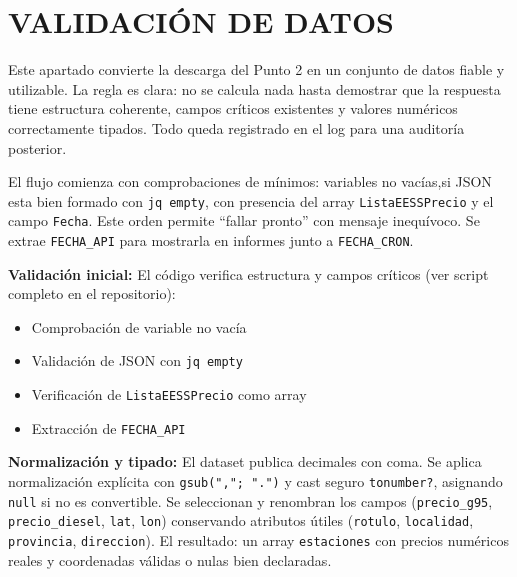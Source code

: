 \chapter{VALIDACIÓN DE DATOS}

Este apartado convierte la descarga del Punto 2 en un conjunto de datos fiable y utilizable. La regla es clara: no se calcula nada hasta demostrar que la respuesta tiene estructura coherente, campos críticos existentes y valores numéricos correctamente tipados. Todo queda registrado en el log para una auditoría posterior.

El flujo comienza con comprobaciones de mínimos: variables no vacías,si JSON esta bien formado con \texttt{jq empty}, con presencia del array \texttt{ListaEESSPrecio} y el campo \texttt{Fecha}. Este orden permite ``fallar pronto'' con mensaje inequívoco. Se extrae \texttt{FECHA\_API} para mostrarla en informes junto a \texttt{FECHA\_CRON}.

\textbf{Validación inicial:} El código verifica estructura y campos críticos (ver script completo en el repositorio):

\begin{itemize}[noitemsep]
  \item Comprobación de variable no vacía
  \item Validación de JSON con \texttt{jq empty}
  \item Verificación de \texttt{ListaEESSPrecio} como array
  \item Extracción de \texttt{FECHA\_API}
\end{itemize}

\textbf{Normalización y tipado:} El dataset publica decimales con coma. Se aplica normalización explícita con \texttt{gsub(","; ".")} y cast seguro \texttt{tonumber?}, asignando \texttt{null} si no es convertible. Se seleccionan y renombran los campos (\texttt{precio\_g95}, \texttt{precio\_diesel}, \texttt{lat}, \texttt{lon}) conservando atributos útiles (\texttt{rotulo}, \texttt{localidad}, \texttt{provincia}, \texttt{direccion}). El resultado: un array \texttt{estaciones} con precios numéricos reales y coordenadas válidas o nulas bien declaradas.

